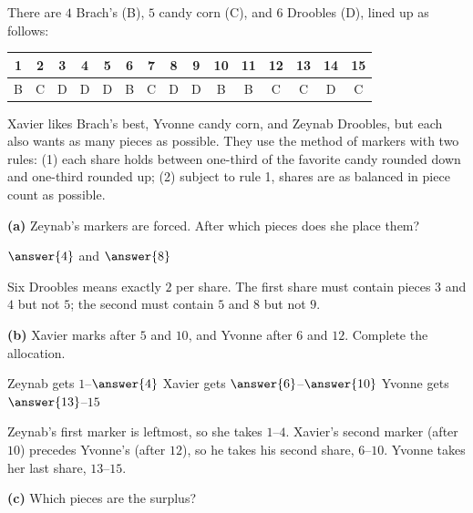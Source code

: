 \documentclass[12pt]{ximera}
\begin{document}
\begin{problem}
There are $4$ Brach's (B), $5$ candy corn (C), and $6$ Droobles (D), lined up as follows:
\begin{center}
\begin{tabular}{ccccccccccccccc}
1 & 2 & 3 & 4 & 5 & 6 & 7 & 8 & 9 & 10 & 11 & 12 & 13 & 14 & 15\\\hline
B & C & D & D & D & B & C & D & D & B & B & C & C & D & C
\end{tabular}
\end{center}
Xavier likes Brach's best, Yvonne candy corn, and Zeynab Droobles, but each also wants as
many pieces as possible. They use the method of markers with two rules: (1) each share
holds between one-third of the favorite candy rounded down and one-third rounded up; (2)
subject to rule 1, shares are as balanced in piece count as possible.

\begin{prompt}
\textbf{(a)} Zeynab's markers are forced. After which pieces does she place them?

$\answer{4}$ and $\answer{8}$
\begin{feedback}
Six Droobles means exactly $2$ per share. The first share must contain pieces $3$ and $4$
but not $5$; the second must contain $5$ and $8$ but not $9$.
\end{feedback}
\end{prompt}

\begin{prompt}
\textbf{(b)} Xavier marks after $5$ and $10$, and Yvonne after $6$ and $12$. Complete the
allocation.

Zeynab gets $1$--$\answer{4}$ \quad Xavier gets $\answer{6}$--$\answer{10}$ \quad
Yvonne gets $\answer{13}$--$15$
\begin{feedback}
Zeynab's first marker is leftmost, so she takes $1$--$4$. Xavier's second marker
(after $10$) precedes Yvonne's (after $12$), so he takes his second share, $6$--$10$.
Yvonne takes her last share, $13$--$15$.
\end{feedback}
\end{prompt}

\begin{prompt}
\textbf{(c)} Which pieces are the surplus?
\begin{selectAll}
\end{selectAll}
\end{prompt}
\end{problem}
\end{document}
